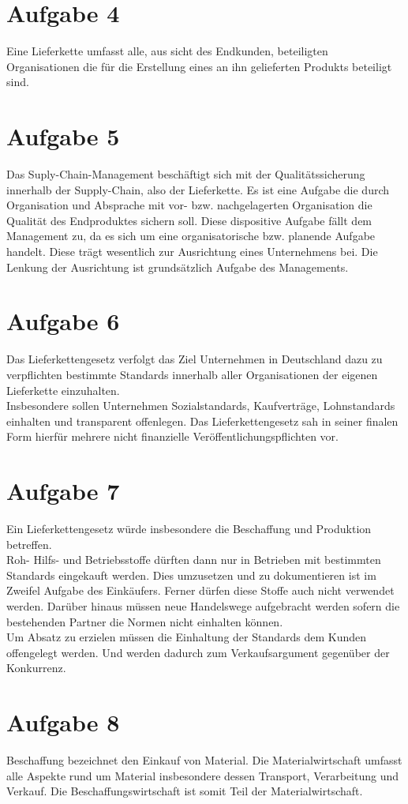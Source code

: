 \documentclass{article}
\begin{document}
	\section*{Aufgabe 4}
	Eine Lieferkette umfasst alle, aus sicht des Endkunden, beteiligten Organisationen die für die Erstellung eines an ihn gelieferten Produkts beteiligt sind.
	\section*{Aufgabe 5}
	Das Suply-Chain-Management beschäftigt sich mit der Qualitätssicherung innerhalb der Supply-Chain, also der Lieferkette. Es ist eine Aufgabe die durch Organisation und Absprache mit vor- bzw. nachgelagerten Organisation die Qualität des Endproduktes sichern soll. Diese dispositive Aufgabe fällt dem Management zu, da es sich um eine organisatorische bzw. planende Aufgabe handelt. Diese trägt wesentlich zur Ausrichtung eines Unternehmens bei. Die Lenkung der Ausrichtung ist grundsätzlich Aufgabe des Managements.
	\section*{Aufgabe 6}
	Das Lieferkettengesetz verfolgt das Ziel Unternehmen in Deutschland dazu zu verpflichten bestimmte Standards innerhalb aller Organisationen der eigenen Lieferkette einzuhalten. \\
	Insbesondere sollen Unternehmen Sozialstandards, Kaufverträge, Lohnstandards einhalten und transparent offenlegen. Das Lieferkettengesetz sah in seiner finalen Form hierfür mehrere nicht finanzielle Veröffentlichungspflichten vor.
	\section*{Aufgabe 7}
	Ein Lieferkettengesetz würde insbesondere die Beschaffung und Produktion betreffen. \\
	Roh- Hilfs- und Betriebsstoffe dürften dann nur in Betrieben mit bestimmten Standards eingekauft werden. Dies umzusetzen und zu dokumentieren ist im Zweifel Aufgabe des Einkäufers. Ferner dürfen diese Stoffe auch nicht verwendet werden. Darüber hinaus müssen neue Handelswege aufgebracht werden sofern die bestehenden Partner die Normen nicht einhalten können. \\
	Um Absatz zu erzielen müssen die Einhaltung der Standards dem Kunden offengelegt werden. Und werden dadurch zum Verkaufsargument gegenüber der Konkurrenz.
	\section*{Aufgabe 8}
	Beschaffung bezeichnet den Einkauf von Material. Die Materialwirtschaft umfasst alle Aspekte rund um Material insbesondere dessen Transport, Verarbeitung und Verkauf. Die Beschaffungswirtschaft ist somit Teil der Materialwirtschaft.
\end{document}
